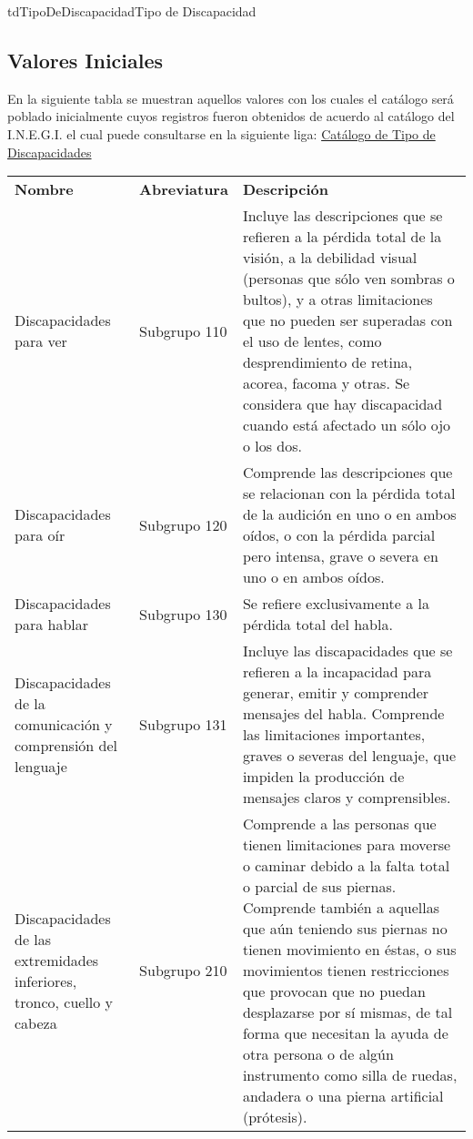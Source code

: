 \begin{TipoDeDato}{tdTipoDeDiscapacidad}{Tipo de Discapacidad}
	\subsection{Valores Iniciales}
	En la siguiente tabla se muestran aquellos valores con los cuales el catálogo será poblado inicialmente cuyos registros fueron obtenidos de acuerdo al catálogo del I.N.E.G.I. el cual puede consultarse en la siguiente liga: \hyperlink{http://www.inegi.org.mx/est/contenidos/proyectos/aspectosmetodologicos/clasificadoresycatalogos/doc/clasificacion_de_tipo_de_discapacidad.pdf}{Catálogo de Tipo de Discapacidades}\cdtEmpty
		\begin{longtable}{| p{}| p{}|p{}|}
	 			\rowcolor{colorPrincipal}
	 			\multicolumn{3}{|c|}{\bf \color{white} Valores Iniciales}\\
	 			\hline
	 			\rowcolor{colorSecundario}
	 			\bf \color{white} Nombre & \bf \color{white} Abreviatura &  \bf \color{white} Descripción\\
	 			\hline
				Discapacidades para ver & Subgrupo 110 & Incluye las descripciones que se refieren a la pérdida total de la visión, a la debilidad visual (personas que sólo ven sombras o bultos), y a otras limitaciones que no pueden ser superadas con el uso de lentes, como desprendimiento de retina, acorea, facoma y otras. Se considera que hay discapacidad cuando está afectado un sólo ojo o los dos.\\
				\hline
				Discapacidades para oír & Subgrupo 120& Comprende las descripciones que se relacionan con la pérdida total de la audición en uno o en ambos oídos, o con la pérdida parcial pero intensa, grave o severa en uno o en ambos oídos. \\
				\hline
				Discapacidades para hablar & Subgrupo 130 &  Se refiere exclusivamente a la pérdida total del habla.\\
				\hline
				Discapacidades de la comunicación y comprensión del lenguaje & Subgrupo 131 & Incluye las discapacidades que se refieren a la incapacidad para generar, emitir y comprender mensajes del habla. Comprende las limitaciones importantes, graves o severas del lenguaje, que impiden la producción de mensajes claros y comprensibles.\\
				\hline
				Discapacidades de las extremidades inferiores, tronco, cuello y cabeza & Subgrupo 210 & Comprende a las personas que tienen limitaciones para moverse o caminar debido a la falta total o parcial de sus piernas. Comprende también a aquellas que aún teniendo sus piernas no tienen movimiento en éstas, o sus movimientos tienen restricciones que provocan que no puedan desplazarse por sí mismas, de tal forma que necesitan la ayuda de otra persona o de algún instrumento como silla de ruedas, andadera o una pierna artificial (prótesis). \\

\end{longtable}
\end{TipoDeDato}
